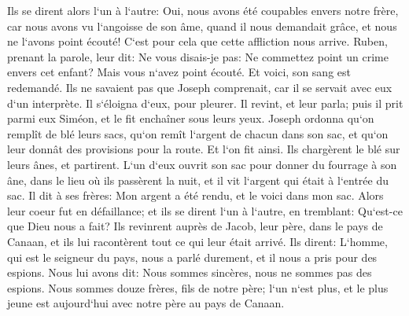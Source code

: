 \verse Ils se dirent alors l`un à l`autre: Oui, nous avons été coupables envers notre frère, car nous avons vu l`angoisse de son âme, quand il nous demandait grâce, et nous ne l`avons point écouté! C`est pour cela que cette affliction nous arrive. 
\verse Ruben, prenant la parole, leur dit: Ne vous disais-je pas: Ne commettez point un crime envers cet enfant? Mais vous n`avez point écouté. Et voici, son sang est redemandé. 
\verse Ils ne savaient pas que Joseph comprenait, car il se servait avec eux d`un interprète. 
\verse Il s`éloigna d`eux, pour pleurer. Il revint, et leur parla; puis il prit parmi eux Siméon, et le fit enchaîner sous leurs yeux. 
\verse Joseph ordonna qu`on remplît de blé leurs sacs, qu`on remît l`argent de chacun dans son sac, et qu`on leur donnât des provisions pour la route. Et l`on fit ainsi. 
\verse Ils chargèrent le blé sur leurs ânes, et partirent. 
\verse L`un d`eux ouvrit son sac pour donner du fourrage à son âne, dans le lieu où ils passèrent la nuit, et il vit l`argent qui était à l`entrée du sac. 
\verse Il dit à ses frères: Mon argent a été rendu, et le voici dans mon sac. Alors leur coeur fut en défaillance; et ils se dirent l`un à l`autre, en tremblant: Qu`est-ce que Dieu nous a fait? 
\verse Ils revinrent auprès de Jacob, leur père, dans le pays de Canaan, et ils lui racontèrent tout ce qui leur était arrivé. Ils dirent: 
\verse L`homme, qui est le seigneur du pays, nous a parlé durement, et il nous a pris pour des espions. 
\verse Nous lui avons dit: Nous sommes sincères, nous ne sommes pas des espions. 
\verse Nous sommes douze frères, fils de notre père; l`un n`est plus, et le plus jeune est aujourd`hui avec notre père au pays de Canaan. 
